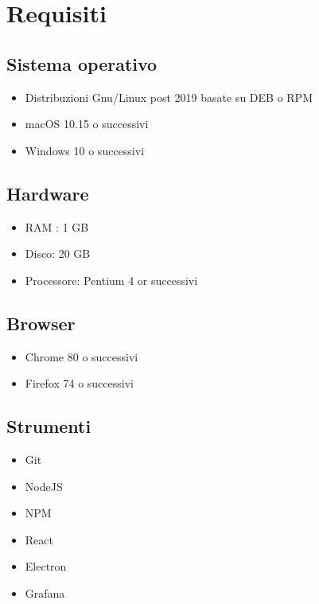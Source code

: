 \section{Requisiti}
\subsection{Sistema operativo}
\begin{itemize}
	\item Distribuzioni Gnu/Linux post 2019 basate su DEB o RPM 
	\item macOS 10.15 o successivi
	\item Windows 10 o successivi
\end{itemize}

\subsection{Hardware}
\begin{itemize}
	\item RAM : 1 GB
	\item Disco: 20 GB
	\item Processore: Pentium 4 or successivi
\end{itemize}

\subsection{Browser}
\begin{itemize}
	\item Chrome 80 o successivi
	\item Firefox 74 o successivi
\end{itemize}

\subsection{Strumenti}
\begin{itemize}
	\item Git
	\item NodeJS
	\item NPM
	\item React
	\item Electron
	\item Grafana
\end{itemize}